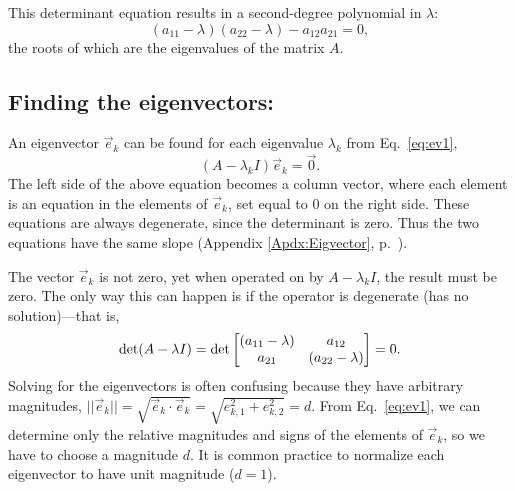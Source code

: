 \documentclass{ximera}
\begin{document}
This determinant equation results in a second-degree polynomial in $\lambda$:
\[
(a_{11}-\lambda) (a_{22}-\lambda) - a_{12} a_{21} =0,
\]
the roots of which are the eigenvalues of the matrix $A$.

\subsection{Finding the eigenvectors:}
An eigenvector $\vec{e}_k$ can be found for each eigenvalue $\lambda_k$ from Eq.~\ref{eq:ev1},
\[ (A-\lambda_k I)\vec{e}_k =\vec{0}. \]
The left side of the above equation becomes a column vector, where each element is an equation in the
elements of $\vec{e}_k$, set equal to 0 on the right side. These equations are always degenerate,
since the determinant is zero. Thus the two equations have the same slope
\red (Appendix \ref{Apdx:Eigvector}, p.~\pageref{Apdx:Eigvector}).
\black

The vector $\vec{e}_k$ is not zero, yet when operated on by $A-\lambda_kI$, the result must be zero.
The only way this can happen is if the operator is degenerate (has no solution)---that is, 
\begin{equation}
\text{det}(A-\lambda I) = \text{det} 
\begin{bmatrix}
(a_{11}-\lambda) & a_{12} \\
a_{21} & (a_{22}-\lambda)
\end{bmatrix}
= 0 .
\end{equation}
Solving for the eigenvectors is often confusing because they have arbitrary magnitudes,
$||\vec{e}_k|| = \sqrt{\vec{e}_k \cdot \vec{e}_k} = \sqrt{e_{k,1}^2 + e_{k,2}^2} = d$.
From Eq.~\ref{eq:ev1}, we can determine only the relative magnitudes and signs of the elements of $\vec{e}_k$, so we have to choose a magnitude $d$. It is common practice to normalize each eigenvector to have unit magnitude ($d=1$).



	{%
 \renewcommand{\sol}[1]{} %



\newpage
\renewcommand{\sol}[1]{ {\blue{\bf Solution:~}#1}{\gray\tiny$\blacksquare$} }
	}%

\end{document}
